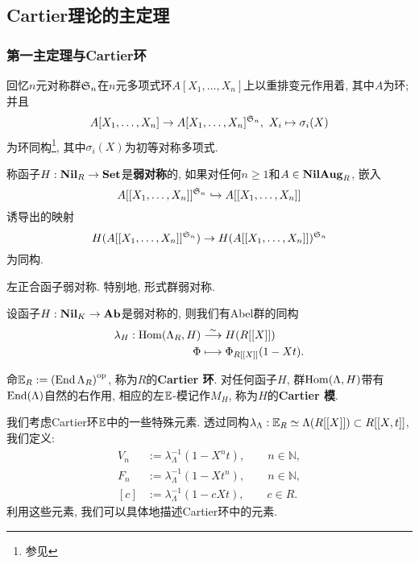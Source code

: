 \subsection{Cartier理论的主定理}

\subsubsection{第一主定理与Cartier环}

回忆$n$元对称群$\mathfrak{S}_{n}$在$n$元多项式环$A[X_1, \dots, X_n]$上以重排变元作用着, 其中$A$为环;
并且\[A[X_1, \dots, X_n]\to A[X_1, \dots, X_n]^{\mathfrak{S}_{n}},\ X_i\mapsto \sigma_i(X) \]
为环同构\footnote{参见\cite[定理5.8.5]{Li19}}, 其中$\sigma_i(X)$为初等对称多项式.

\begin{definition}\label{def: weak symm}
    称函子$H : \mathbf{Nil}_R\to\mathbf{Set}$是\textbf{弱对称}的, 如果对任何$n\ge 1$和$A\in\mathbf{NilAug}_R$,
    嵌入\[A[[X_1, \dots, X_n]]^{\mathfrak{S}_{n}}\hookrightarrow A[[X_1, \dots, X_n]]\]
    诱导出的映射\[H(A[[X_1, \dots, X_n]]^{\mathfrak{S}_{n}})\to H(A[[X_1, \dots, X_n]])^{\mathfrak{S}_{n}}\]为同构.
\end{definition}

\begin{example}
    左正合函子弱对称. 特别地, 形式群弱对称.
\end{example}

\begin{theorem}[Cartier第一主定理]\label{Hom(Lambda H) isomto H(R[[X]])}
    \cite[Theorem 3.5]{Zi84}
    设函子$H : \mathbf{Nil}_K\to\mathbf{Ab}$是弱对称的, 则我们有Abel群的同构
    \begin{align*}
        \lambda_H : \operatorname{Hom}(\Lambda_R, H)&\stackrel{\sim}{\longrightarrow} H(R[[X]])\\
                    \Phi&\longmapsto\Phi_{R[[X]]}(1-Xt).
    \end{align*}
\end{theorem}
\begin{definition}
    命$\mathbb{E}_R := \left( \operatorname{End} \Lambda_R \right)^{\mathrm{op}}$, 称为$R$的\textbf{Cartier 环}.
    对任何函子$H$, 群$\operatorname{Hom}(\Lambda, H)$带有$\operatorname{End}(\Lambda)$自然的右作用, 相应的左$\mathbb{E}$-模记作$M_H$,
    称为$H$的\textbf{Cartier 模}.
\end{definition}

我们考虑Cartier环$\mathbb{E}$中的一些特殊元素. 透过同构$\lambda_\Lambda : \mathbb{E}_R\simeq \Lambda(R[[X]])\subset R[[X, t]]$, 我们定义:
    \begin{align*}
    V_n &:= \lambda_\Lambda^{-1}(1-X^nt),\qquad n\in\mathbb{N},\\
    F_n &:= \lambda_\Lambda^{-1}(1-Xt^n),\qquad n\in\mathbb{N},\\
    [c] &:= \lambda_\Lambda^{-1}(1-cXt),\qquad c\in R.
\end{align*}
利用这些元素, 我们可以具体地描述Cartier环中的元素.

